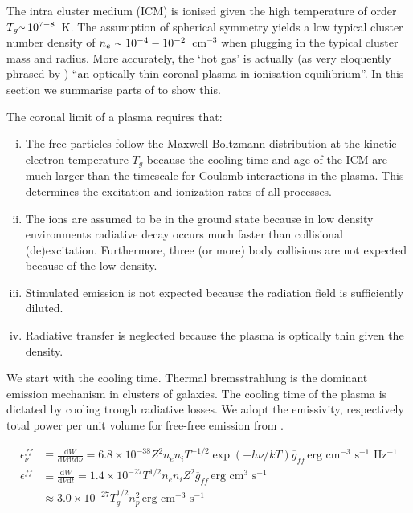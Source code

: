 \documentclass[MScProj_TLRH_ClusterEnergy.tex]{subfiles}
\begin{document}
The intra cluster medium (ICM) is ionised given the high temperature of order 
$T_g \mytilde \, 10^{7-8}$~K. The assumption of spherical symmetry yields a low 
typical cluster number density of $n_e~\mytilde~10^{-4}-10^{-2}$~cm$^{-3}$ when
plugging in the typical cluster mass and radius. More accurately, the `hot gas' 
is actually (as very eloquently phrased by \citet{2007ARA&A..45..117M}) ``an
optically thin coronal plasma in ionisation equilibrium''. In this section we
summarise parts of \citet{1988xrec.book.....S} to show this.

The coronal limit of a plasma requires that:

\begin{enumerate}[i)]
    \item The free particles follow the Maxwell-Boltzmann distribution at
          the kinetic electron temperature $T_g$ because the cooling time and
          age of the ICM are much larger than the timescale for Coulomb 
          interactions in the plasma. This determines the excitation and
          ionization rates of all processes.
    \item The ions are assumed to be in the ground state because in low density
          environments radiative decay occurs much faster than collisional 
          (de)excitation. Furthermore, three (or more) body collisions are not
          expected because of the low density.
    \item Stimulated emission is not expected because the radiation field is
          sufficiently diluted.
    \item Radiative transfer is neglected because the plasma is optically
          thin given the density.
\end{enumerate}

We start with the cooling time. Thermal bremsstrahlung is the dominant emission
mechanism in clusters of galaxies. The cooling time of the plasma is dictated by
cooling trough radiative losses. We adopt the emissivity, respectively total power
per unit volume for free-free emission from \citet{1979rpa..book.....R}.

\begin{align}
    \epsilon_\nu^{ff} &\equiv \frac{\mathrm{d}W}{\mathrm{d}V \mathrm{d}t \mathrm{d}\nu} =
    6.8 \times 10^{-38} Z^2 n_e n_i T^{-1/2} 
    \exp \left(-h\nu / kT \right) \overline{g}_{ff}
    \, \text{erg cm$^{-3}$ s$^{-1}$ Hz$^{-1}$} \label{eq:Lx-freefree} \\
    \epsilon^{ff} &\equiv \frac{\mathrm{d}W}{\mathrm{d}V \mathrm{d}t} =
    1.4 \times 10^{-27} T^{1/2} n_e n_i Z^2 \overline{g}_{ff} 
    \, \text{erg cm$^3$ s$^{-1}$} \label{eq:freefreepower} \\
    &\approx 3.0 \times 10^{-27} T_g^{1/2} n_p^2 \, \text{erg cm$^{-3}$ s$^{-1}$}
\end{align}
\end{document}
